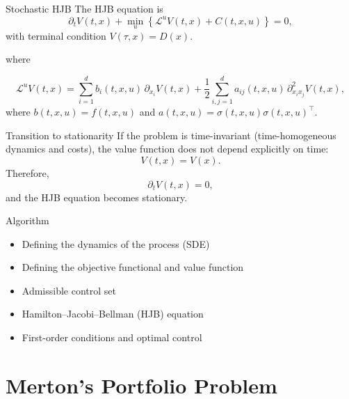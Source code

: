 \documentclass{beamer}
\theoremstyle{definition}
\begin{document}
\begin{frame}{Stochastic HJB}
    The HJB equation is
    \begin{equation}
        \partial_t V(t,x) + \min_{u} \left\{ \mathcal{L}^u V(t,x) + C(t,x,u) \right\} = 0,
    \end{equation}
    with terminal condition \(V(\tau,x)=D(x)\).

    where

    \begin{equation*}
        \mathcal{L}^u V(t,x) = \sum_{i=1}^{d} b_i(t,x,u)\,\partial_{x_i} V(t,x)
    + \frac{1}{2} \sum_{i,j=1}^{d} a_{ij}(t,x,u)\,\partial^{2}_{x_i x_j} V(t,x),
    \end{equation*}
    where \(b(t,x,u)=f(t,x,u)\) and \(a(t,x,u)=\sigma(t,x,u)\sigma(t,x,u)^\top\).
    
\end{frame}

\begin{frame}{Transition to stationarity}
    If the problem is time-invariant (time-homogeneous dynamics and costs), the value function does not depend explicitly on time:
\[
V(t,x) = V(x).
\]
Therefore,
\[
\partial_t V(t,x) = 0,
\]
and the HJB equation becomes stationary.
\end{frame}


\begin{frame}{Algorithm}
    \begin{itemize}
        \item Defining the dynamics of the process (SDE)
        \item Defining the objective functional and value function
        \item Admissible control set
        \item Hamilton--Jacobi--Bellman (HJB) equation
        \item First-order conditions and optimal control
    \end{itemize}
\end{frame}

\section{Merton's Portfolio Problem}
\subsection{}
\end{document}
